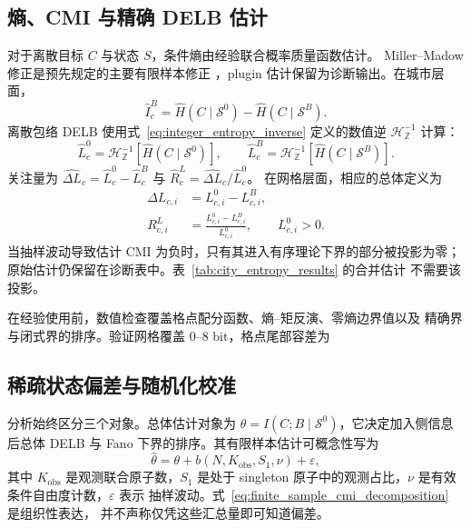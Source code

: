 

\subsection{熵、CMI 与精确 DELB 估计}
\label{subsec:entropy_estimation}

对于离散目标 \(C\) 与状态 \(S\)，条件熵由经验联合概率质量函数估计。
Miller--Madow 修正是预先规定的主要有限样本修正
\citep{miller1955}，plugin 估计保留为诊断输出。在城市层面，
\begin{equation}
\widehat I^{B}_{c}
=\widehat H(C\mid\mathcal{S}^{0})
-\widehat H(C\mid\mathcal{S}^{B}).
\label{eq:empirical_cmi}
\end{equation}
离散包络 DELB 使用式~\eqref{eq:integer_entropy_inverse} 定义的数值逆
\(\mathcal H_{\mathbb Z}^{-1}\) 计算：
\begin{equation}
\widehat L^0_c
=\mathcal H_{\mathbb Z}^{-1}
\!\left[\widehat H(C\mid\mathcal S^0)\right],
\qquad
\widehat L^B_c
=\mathcal H_{\mathbb Z}^{-1}
\!\left[\widehat H(C\mid\mathcal S^B)\right].
\label{eq:empirical_exact_bounds}
\end{equation}
关注量为
\(\widehat{\Delta L}_c=\widehat L^0_c-\widehat L^B_c\) 与
\(\widehat R^L_c=\widehat{\Delta L}_c/\widehat L^0_c\)。
在网格层面，相应的总体定义为
\begin{align}
\Delta L_{c,i}
&=L^0_{c,i}-L^B_{c,i},
\label{eq:absolute_bound_reduction}\\
R^L_{c,i}
&=\frac{L^0_{c,i}-L^B_{c,i}}{L^0_{c,i}},
\qquad L^0_{c,i}>0.
\label{eq:relative_bound_reduction}
\end{align}
当抽样波动导致估计 CMI 为负时，只有其进入有序理论下界的部分被投影为零；
原始估计仍保留在诊断表中。表~\ref{tab:city_entropy_results} 的合并估计
不需要该投影。

在经验使用前，数值检查覆盖格点配分函数、熵--矩反演、零熵边界值以及
精确界与闭式界的排序。验证网格覆盖 0--8 bit，格点尾部容差为

\subsection{稀疏状态偏差与随机化校准}
\label{subsec:three_inference_layers}

分析始终区分三个对象。总体估计对象为
\(\theta=I(C;B\mid\mathcal S^0)\)，它决定加入侧信息后总体 DELB 与
Fano 下界的排序。其有限样本估计可概念性写为
\begin{equation}
\widehat\theta
=\theta+b(N,K_{\mathrm{obs}},S_1,\nu)+\varepsilon,
\label{eq:finite_sample_cmi_decomposition}
\end{equation}
其中 \(K_{\mathrm{obs}}\) 是观测联合原子数，\(S_1\) 是处于 singleton
原子中的观测占比，\(\nu\) 是有效条件自由度计数，\(\varepsilon\) 表示
抽样波动。式~\eqref{eq:finite_sample_cmi_decomposition} 是组织性表达，
并不声称仅凭这些汇总量即可知道偏差。

